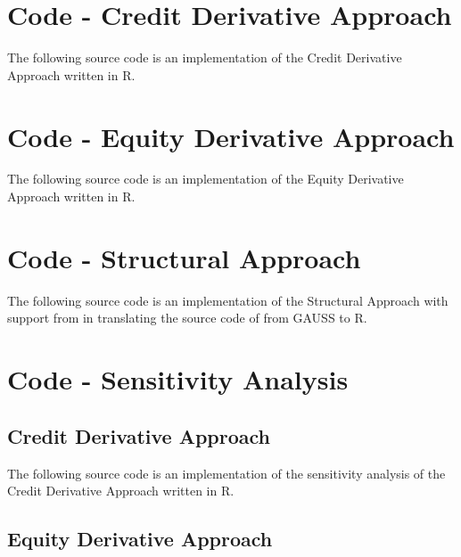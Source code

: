 \chapter{Code - Credit Derivative Approach}

The following source code is an implementation of the Credit Derivative Approach \citep{de2011pricing} written in R.
 


\chapter{Code - Equity Derivative Approach}

The following source code is an implementation of the Equity Derivative Approach \citep{de2011pricing} written in R.
 


\chapter{Code - Structural Approach}

The following source code is an implementation of the Structural Approach \citep{pennacchi2010structural} with support from \citet{codestructrural} in translating the source code of \citet{pennacchi2010structural} from GAUSS to R.
 


\chapter{Code - Sensitivity Analysis}

\section{Credit Derivative Approach}

The following source code is an implementation of the sensitivity analysis of the Credit Derivative Approach \citep{de2011pricing} written in R.
 


\section{Equity Derivative Approach}


